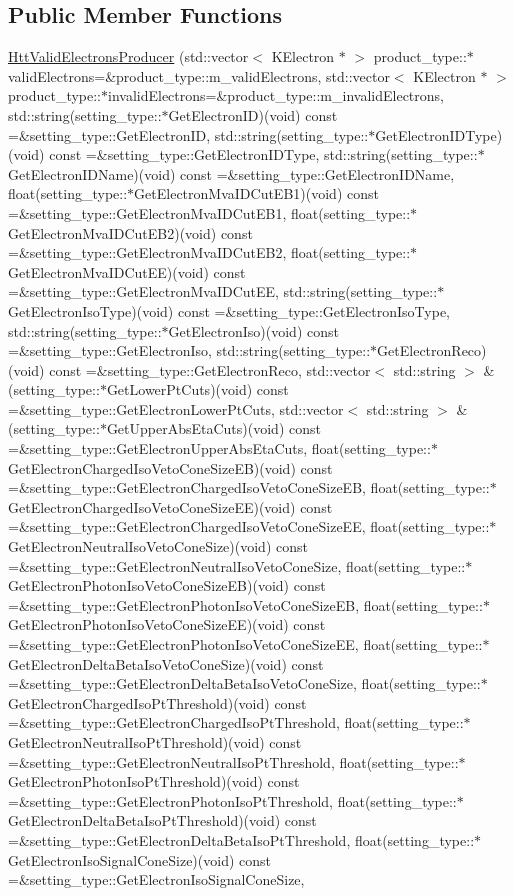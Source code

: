 \subsection*{Public Member Functions}
\begin{DoxyCompactItemize}
\item 
\hyperlink{classHttValidElectronsProducer_a8e773bcd5e4cb3261727af6db04760b3}{HttValidElectronsProducer} (std::vector$<$ KElectron $\ast$ $>$ product\_\-type::$\ast$validElectrons=\&product\_\-type::m\_\-validElectrons, std::vector$<$ KElectron $\ast$ $>$ product\_\-type::$\ast$invalidElectrons=\&product\_\-type::m\_\-invalidElectrons, std::string(setting\_\-type::$\ast$GetElectronID)(void) const =\&setting\_\-type::GetElectronID, std::string(setting\_\-type::$\ast$GetElectronIDType)(void) const =\&setting\_\-type::GetElectronIDType, std::string(setting\_\-type::$\ast$GetElectronIDName)(void) const =\&setting\_\-type::GetElectronIDName, float(setting\_\-type::$\ast$GetElectronMvaIDCutEB1)(void) const =\&setting\_\-type::GetElectronMvaIDCutEB1, float(setting\_\-type::$\ast$GetElectronMvaIDCutEB2)(void) const =\&setting\_\-type::GetElectronMvaIDCutEB2, float(setting\_\-type::$\ast$GetElectronMvaIDCutEE)(void) const =\&setting\_\-type::GetElectronMvaIDCutEE, std::string(setting\_\-type::$\ast$GetElectronIsoType)(void) const =\&setting\_\-type::GetElectronIsoType, std::string(setting\_\-type::$\ast$GetElectronIso)(void) const =\&setting\_\-type::GetElectronIso, std::string(setting\_\-type::$\ast$GetElectronReco)(void) const =\&setting\_\-type::GetElectronReco, std::vector$<$ std::string $>$ \&(setting\_\-type::$\ast$GetLowerPtCuts)(void) const =\&setting\_\-type::GetElectronLowerPtCuts, std::vector$<$ std::string $>$ \&(setting\_\-type::$\ast$GetUpperAbsEtaCuts)(void) const =\&setting\_\-type::GetElectronUpperAbsEtaCuts, float(setting\_\-type::$\ast$GetElectronChargedIsoVetoConeSizeEB)(void) const =\&setting\_\-type::GetElectronChargedIsoVetoConeSizeEB, float(setting\_\-type::$\ast$GetElectronChargedIsoVetoConeSizeEE)(void) const =\&setting\_\-type::GetElectronChargedIsoVetoConeSizeEE, float(setting\_\-type::$\ast$GetElectronNeutralIsoVetoConeSize)(void) const =\&setting\_\-type::GetElectronNeutralIsoVetoConeSize, float(setting\_\-type::$\ast$GetElectronPhotonIsoVetoConeSizeEB)(void) const =\&setting\_\-type::GetElectronPhotonIsoVetoConeSizeEB, float(setting\_\-type::$\ast$GetElectronPhotonIsoVetoConeSizeEE)(void) const =\&setting\_\-type::GetElectronPhotonIsoVetoConeSizeEE, float(setting\_\-type::$\ast$GetElectronDeltaBetaIsoVetoConeSize)(void) const =\&setting\_\-type::GetElectronDeltaBetaIsoVetoConeSize, float(setting\_\-type::$\ast$GetElectronChargedIsoPtThreshold)(void) const =\&setting\_\-type::GetElectronChargedIsoPtThreshold, float(setting\_\-type::$\ast$GetElectronNeutralIsoPtThreshold)(void) const =\&setting\_\-type::GetElectronNeutralIsoPtThreshold, float(setting\_\-type::$\ast$GetElectronPhotonIsoPtThreshold)(void) const =\&setting\_\-type::GetElectronPhotonIsoPtThreshold, float(setting\_\-type::$\ast$GetElectronDeltaBetaIsoPtThreshold)(void) const =\&setting\_\-type::GetElectronDeltaBetaIsoPtThreshold, float(setting\_\-type::$\ast$GetElectronIsoSignalConeSize)(void) const =\&setting\_\-type::GetElectronIsoSignalConeSize, 
\end{DoxyCompactItemize}
